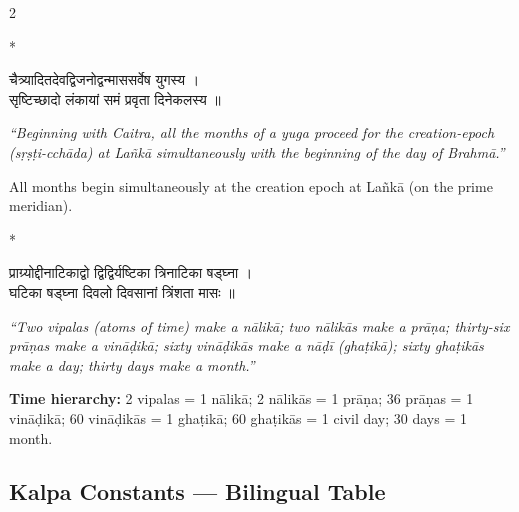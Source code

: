\documentclass[11pt,a4paper]{article}
\newcommand{\dev}[1]{{\devanagarifont #1}}
\theoremstyle{definition}
\begin{document}
\begin{paracol}{2}

\switchcolumn[0]*\noindent
\begin{tcolorbox}[colback=sktbg,colframe=vertrule,boxrule=0.5pt,arc=3pt]
\dev{चैत्र्यादितदेवद्विजनोद्वन्माससर्वेष युगस्य ।\\
सृष्टिच्छादो लंकायां समं प्रवृता दिनेकलस्य ॥}
\end{tcolorbox}

\switchcolumn\noindent
\begin{tcolorbox}[colback=transbg,colframe=vertrule!60,boxrule=0.5pt,arc=3pt]
\textit{``Beginning with Caitra, all the months of a yuga proceed for the creation-epoch (s\d{r}\d{s}\d{t}i-cch\=ada) at La\~nk\=a simultaneously with the beginning of the day of Brahm\=a.''}

All months begin simultaneously at the creation epoch at La\~nk\=a (on the prime meridian).
\end{tcolorbox}

\switchcolumn[0]*\noindent
\begin{tcolorbox}[colback=sktbg,colframe=vertrule,boxrule=0.5pt,arc=3pt]
\dev{प्राग्र्योद्दीनाटिकाद्वो द्विद्विर्यष्टिका त्रिनाटिका षड्घ्ना ।\\
घटिका षड्घ्ना दिवलो दिवसानां त्रिंशता मासः ॥}
\end{tcolorbox}

\switchcolumn\noindent
\begin{tcolorbox}[colback=transbg,colframe=vertrule!60,boxrule=0.5pt,arc=3pt]
\textit{``Two vipalas (atoms of time) make a n\=alik\=a; two n\=alik\=as make a pr\=a\d{n}a; thirty-six pr\=a\d{n}as make a vin\=a\d{d}ik\=a; sixty vin\=a\d{d}ik\=as make a n\=a\d{d}\={i} (gha\d{t}ik\=a); sixty gha\d{t}ik\=as make a day; thirty days make a month.''}

\textbf{Time hierarchy:} 2 vipalas = 1 n\=alik\=a; 2 n\=alik\=as = 1 pr\=a\d{n}a; 36 pr\=a\d{n}as = 1 vin\=a\d{d}ik\=a; 60 vin\=a\d{d}ik\=as = 1 gha\d{t}ik\=a; 60 gha\d{t}ik\=as = 1 civil day; 30 days = 1 month.
\end{tcolorbox}

\end{paracol}

\subsection*{Kalpa Constants --- Bilingual Table}
\end{document}
